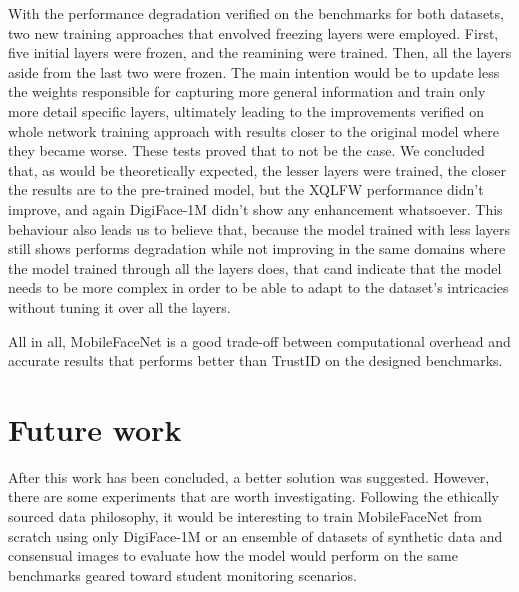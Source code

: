 \documentclass[class=report, crop=false, a4paper, 12pt]{standalone}
\begin{document}
\par With the performance degradation verified on the benchmarks for both datasets, two new training approaches that envolved freezing layers were employed. First, five initial layers were frozen, and the reamining were trained. Then, all the layers aside from the last two were frozen. The main intention would be to update less the weights responsible for capturing more general information and train only more detail specific layers, ultimately leading to the improvements verified on whole network training approach with results closer to the original model where they became worse. These tests proved that to not be the case. We concluded that, as would be theoretically expected, the lesser layers were trained, the closer the results are to the pre-trained model, but the XQLFW performance didn't improve, and again DigiFace-1M didn't show any enhancement whatsoever. This behaviour also leads us to believe that, because the model trained with less layers still shows performs degradation while not improving in the same domains where the model trained through all the layers does, that cand indicate that the model needs to be more complex in order to be able to adapt to the dataset's intricacies without tuning it over all the layers.

\par All in all, MobileFaceNet is a good trade-off between computational overhead and accurate results that performs better than TrustID on the designed benchmarks. 

\section{Future work}
After this work has been concluded, a better solution was suggested. However, there are some experiments that are worth investigating. Following the ethically sourced data philosophy, it would be interesting to train MobileFaceNet from scratch using only DigiFace-1M or an ensemble of datasets of synthetic data and consensual images to evaluate how the model would perform on the same benchmarks geared toward student monitoring scenarios.
\end{document}
